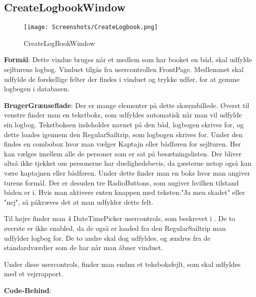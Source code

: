 \subsection{CreateLogbookWindow}

\begin{wrapfigure}{r}{0.5\textwidth}
    \label{img:login_interface}
    \vspace{-20pt}
    \begin{center}
        \texttt{[image: Screenshots/CreateLogbook.png]}
    \end{center}
    \vspace{-15pt}
    \caption{CreateLogBookWindow}
    \vspace{-30pt}
\end{wrapfigure}

\textbf{Formål}: Dette vindue bruges når et medlem som har booket en båd, skal udfylde sejlturens logbog. Vinduet tilgås fra usercontrollen FrontPage. Medlemmet skal udfylde de forskellige felter der findes i vinduet og trykke udfør, for at gemme logbogen i databasen.

\textbf{BrugerGrænseflade}: Der er mange elementer på dette skærmbillede. Øverst til venstre finder man en tekstboks, som udfyldes automatisk når man vil udfylde sin logbog. 
Tekstboksen indeholder navnet på den båd, logbogen skrives for, og dette loades igennem den RegularSailtrip, som logbogen skrives for.
Under den findes en combobox hvor man vælger Kaptajn eller bådføren for sejlturen.
Her kan vælges imellem alle de personer som er sat på besætningslisten. 
Der bliver altså ikke tjekket om personerne har duelighedsbevis, da gæsterne netop også kan være kaptajnen eller bådføren.
Under dette finder man en boks hvor man angiver turens formål. 
Der er desuden tre RadioButtons, som angiver hvilken tilstand båden er i. 
Hvis man aktivere enten knappen med teksten:"Ja men skadet" eller "nej", så påkræves det at man udfylder dette felt. 

Til højre finder man 4 DateTimePicker usercontrols, som beskrevet i . De to øverste er ikke enabled, da de også er loaded fra den RegularSailtrip man udfylder logbog for. De to andre skal dog udfyldes, og ændres fra de standardværdier som de har når man åbner vinduet. 

Under disse usercontrols, finder man endnu et teksboksfejlt, som skal udfyldes med et vejrrapport.


\textbf{Code-Behind}:



